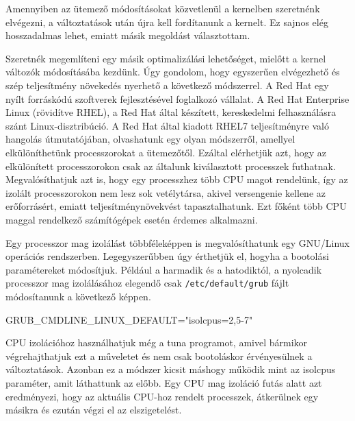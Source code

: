 Amennyiben az ütemező módosításokat közvetlenül a kernelben szeretnénk elvégezni, a változtatások után újra kell fordítanunk a kernelt.
Ez sajnos elég hosszadalmas lehet, emiatt másik megoldást választottam.


Szeretnék megemlíteni egy másik optimalizálási lehetőséget, mielőtt a kernel változók módosításába kezdünk. Úgy gondolom, hogy egyszerűen elvégezhető és szép teljesítmény növekedés nyerhető a következő módszerrel.
A Red Hat egy nyílt forráskódú szoftverek fejlesztésével foglalkozó vállalat. A Red Hat Enterprise Linux (rövidítve RHEL), a Red Hat által készített, kereskedelmi felhasználásra szánt Linux-disztribúció.
A Red Hat által kiadott RHEL7 teljesítményre való hangolás útmutatójában, olvashatunk egy olyan módszerről, amellyel elkülöníthetünk processzorokat a ütemezőtől. Ezáltal elérhetjük azt, hogy az elkülönített processzorokon csak az általunk kiválasztott processzek futhatnak. Megvalósíthatjuk azt is, hogy egy processzhez több CPU magot rendelünk, így az izolált processzorokon nem lesz sok vetélytársa, akivel versengenie kellene az erőforrásért, emiatt teljesítménynövekvést tapasztalhatunk.
Ezt főként több CPU maggal rendelkező számítógépek esetén érdemes alkalmazni.

Egy processzor mag izolálást többféleképpen is megvalósíthatunk egy GNU/Linux operációs rendszerben.
Legegyszerűbben úgy érthetjük el, hogyha a bootolási paramétereket módosítjuk. Például a harmadik és a hatodiktól, a nyolcadik processzor mag izolálásához elegendő csak \texttt{/etc/default/grub} fájlt módosítanunk a következő képpen.

\begin{python}
GRUB_CMDLINE_LINUX_DEFAULT="isolcpus=2,5-7"
\end{python}

CPU izolációhoz használhatjuk még a tuna programot, amivel bármikor végrehajthatjuk ezt a műveletet és nem csak bootoláskor érvényesülnek a változtatások. Azonban ez a módszer kicsit máshogy működik mint az isolcpus paraméter, amit láthattunk az előbb. Egy CPU mag izoláció futás alatt azt eredményezi, hogy az aktuális CPU-hoz rendelt processzek, átkerülnek egy másikra és ezután végzi el az elszigetelést.

